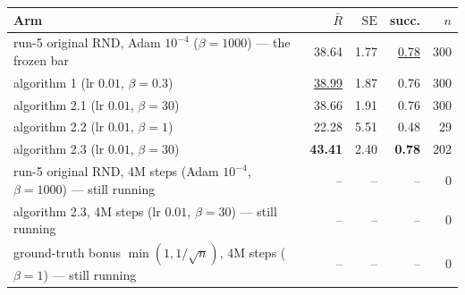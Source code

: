\begin{tabular}{@{}>{\raggedright\arraybackslash}p{5.4cm} r r r r@{}}
\toprule
\textbf{Arm} & $\bar R$ & $\mathrm{SE}$ & succ. & $n$ \\
\midrule
run-5 original RND, Adam $10^{-4}$ ($\beta{=}1000$) --- the frozen bar & 38.64 & 1.77 & \underline{0.78} & 300 \\
\midrule
algorithm 1 (lr $0.01$, $\beta{=}0.3$) & \underline{38.99} & 1.87 & 0.76 & 300 \\
algorithm 2.1 (lr $0.01$, $\beta{=}30$) & 38.66 & 1.91 & 0.76 & 300 \\
algorithm 2.2 (lr $0.01$, $\beta{=}1$) & 22.28 & 5.51 & 0.48 & 29 \\
algorithm 2.3 (lr $0.01$, $\beta{=}30$) & \textbf{43.41} & 2.40 & \textbf{0.78} & 202 \\
\midrule
run-5 original RND, 4M steps (Adam $10^{-4}$, $\beta{=}1000$) --- still running & -- & -- & -- & 0 \\
algorithm 2.3, 4M steps (lr $0.01$, $\beta{=}30$) --- still running & -- & -- & -- & 0 \\
ground-truth bonus $\min(1,1/\sqrt{n})$, 4M steps ($\beta{=}1$) --- still running & -- & -- & -- & 0 \\
\bottomrule
\end{tabular}
